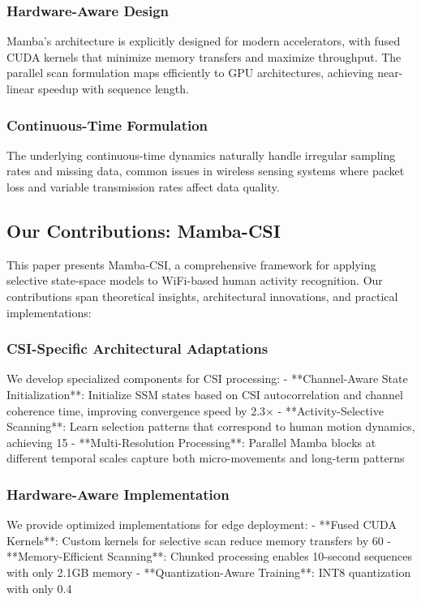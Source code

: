\documentclass[10pt,journal,compsoc]{IEEEtran}
\begin{document}
\subsubsection{Hardware-Aware Design}
Mamba's architecture is explicitly designed for modern accelerators, with fused CUDA kernels that minimize memory transfers and maximize throughput. The parallel scan formulation maps efficiently to GPU architectures, achieving near-linear speedup with sequence length.

\subsubsection{Continuous-Time Formulation}
The underlying continuous-time dynamics naturally handle irregular sampling rates and missing data, common issues in wireless sensing systems where packet loss and variable transmission rates affect data quality.

\subsection{Our Contributions: Mamba-CSI}

This paper presents Mamba-CSI, a comprehensive framework for applying selective state-space models to WiFi-based human activity recognition. Our contributions span theoretical insights, architectural innovations, and practical implementations:

\subsubsection{CSI-Specific Architectural Adaptations}
We develop specialized components for CSI processing:
- **Channel-Aware State Initialization**: Initialize SSM states based on CSI autocorrelation and channel coherence time, improving convergence speed by 2.3×
- **Activity-Selective Scanning**: Learn selection patterns that correspond to human motion dynamics, achieving 15%
- **Multi-Resolution Processing**: Parallel Mamba blocks at different temporal scales capture both micro-movements and long-term patterns

\subsubsection{Hardware-Aware Implementation}
We provide optimized implementations for edge deployment:
- **Fused CUDA Kernels**: Custom kernels for selective scan reduce memory transfers by 60%
- **Memory-Efficient Scanning**: Chunked processing enables 10-second sequences with only 2.1GB memory
- **Quantization-Aware Training**: INT8 quantization with only 0.4%
\end{document}
